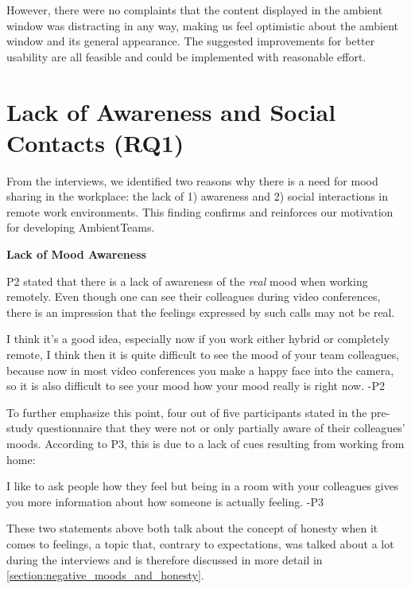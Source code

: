 However, there were no complaints that the content displayed in the ambient window was distracting in any way, making us feel optimistic about the ambient window and its general appearance. The suggested improvements for better usability are all feasible and could be implemented with reasonable effort.

\section{Lack of Awareness and Social Contacts (RQ1)}
\label{section:lack_of_awareness_and_social_contacts}
From the interviews, we identified two reasons why there is a need for mood sharing in the workplace: the lack of 1) awareness and 2) social interactions in remote work environments. This finding confirms and reinforces our motivation for developing AmbientTeams.

\bigskip\noindent\textbf{Lack of Mood Awareness}

\medskip\noindent P2 stated that there is a lack of awareness of the \textit{real} mood when working remotely. Even though one can see their colleagues during video conferences, there is an impression that the feelings expressed by such calls may not be real.

\begin{displayquote}
    I think it's a good idea, especially now if you work either hybrid or completely remote, I think then it is quite difficult to see the mood of your team colleagues, because now in most video conferences you make a happy face into the camera, so it is also difficult to see your mood how your mood really is right now. -P2
\end{displayquote}

To further emphasize this point, four out of five participants stated in the pre-study questionnaire that they were not or only partially aware of their colleagues' moods. According to P3, this is due to a lack of cues resulting from working from home:

\begin{displayquote}
    I like to ask people how they feel but being in a room with your colleagues gives you more information about how someone is actually feeling. -P3
\end{displayquote}

These two statements above both talk about the concept of honesty when it comes to feelings, a topic that, contrary to expectations, was talked about a lot during the interviews and is therefore discussed in more detail in \autoref{section:negative_moods_and_honesty}.

